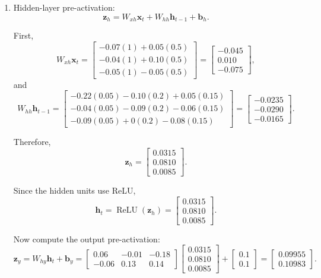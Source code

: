 \documentclass[11pt]{article}
\begin{document}
\begin{enumerate}[label=\alph*)]
\item Hidden-layer pre-activation:
\[
\bm{z}_h = W_{xh}\bm{x}_t + W_{hh}\bm{h}_{t-1} + \bm{b}_h.
\]

First,
\[
W_{xh}\bm{x}_t=
\begin{bmatrix}
-0.07(1)+0.05(0.5)\\
-0.04(1)+0.10(0.5)\\
-0.05(1)-0.05(0.5)
\end{bmatrix}
=
\begin{bmatrix}
-0.045\\
0.010\\
-0.075
\end{bmatrix},
\]
and
\[
W_{hh}\bm{h}_{t-1}=
\begin{bmatrix}
-0.22(0.05)-0.10(0.2)+0.05(0.15)\\
-0.04(0.05)-0.09(0.2)-0.06(0.15)\\
-0.09(0.05)+0(0.2)-0.08(0.15)
\end{bmatrix}
=
\begin{bmatrix}
-0.0235\\
-0.0290\\
-0.0165
\end{bmatrix}.
\]

Therefore,
\[
\bm{z}_h=
\begin{bmatrix}
0.0315\\
0.0810\\
0.0085
\end{bmatrix}.
\]

Since the hidden units use ReLU,
\[
\bm{h}_t=\operatorname{ReLU}(\bm{z}_h)=
\begin{bmatrix}
0.0315\\
0.0810\\
0.0085
\end{bmatrix}.
\]

Now compute the output pre-activation:
\[
\bm{z}_y=W_{hy}\bm{h}_t+\bm{b}_y
=
\begin{bmatrix}
0.06 & -0.01 & -0.18\\
-0.06 & 0.13 & 0.14
\end{bmatrix}
\begin{bmatrix}
0.0315\\
0.0810\\
0.0085
\end{bmatrix}
+
\begin{bmatrix}
0.1\\
0.1
\end{bmatrix}
=
\begin{bmatrix}
0.09955\\
0.10983
\end{bmatrix}.
\]


\end{enumerate}
\end{document}
